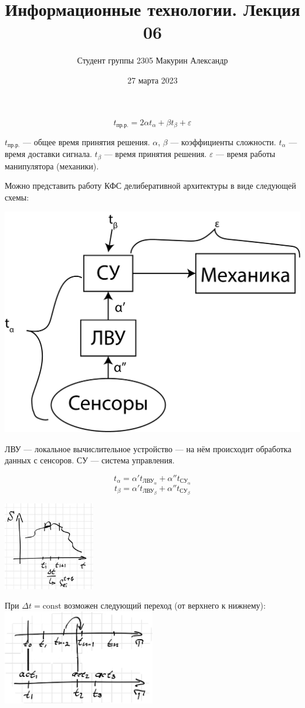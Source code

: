 \documentclass[12pt]{article}
\title{Информационные технологии. Лекция 06}
\author{Студент группы 2305 Макурин Александр}
\date{27 марта 2023}
\begin{document}
\maketitle
\[
    t_\text{пр.р.} = 2 \alpha t_\alpha + \beta t_\beta + \varepsilon
\]

$t_\text{пр.р.}$ — общее время принятия решения. $\alpha$, $\beta$ — коэффициенты сложности. $t_\alpha$ — время доставки сигнала. $t_\beta$ — время принятия решения. $\varepsilon$ — время работы манипулятора (механики).

Можно представить работу КФС делиберативной архитектуры в виде следующей схемы:

\includegraphics{graphics/Сенсоры-ЛВУ-СУ-Механика.png}

ЛВУ — локальное вычислительное устройство — на нём происходит обработка данных с сенсоров. СУ — система управления.

\[
    t_\alpha = \alpha' t_{\text{ЛВУ}_\alpha} + \alpha'' t_{\text{СУ}_\alpha}
\]
\[
    t_\beta = \alpha' t_{\text{ЛВУ}_\beta} + \alpha'' t_{\text{СУ}_\beta}
\]

\includegraphics[width=0.3\textwidth]{graphics/pic01.png}

При $\Delta t = \text{const}$ возможен следующий переход (от верхнего к нижнему): \\
\includegraphics[width=0.5\textwidth]{graphics/pic02.png}
\end{document}
